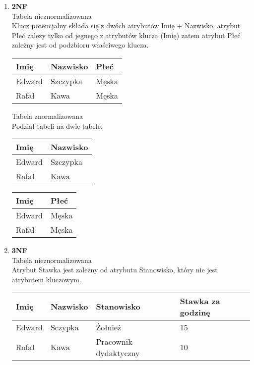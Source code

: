 \documentclass[main.tex]{subfiles}
\begin{document}
\begin{enumerate}
        \item \textbf{2NF}\\
        Tabela nieznormalizowana\\
        Klucz potencjalny składa się z dwóch atrybutów Imię + Nazwisko, atrybut Płeć zalezy tylko od jegnego z atrybutów klucza (Imię) zatem atrybut Płeć zależny jest od podzbioru właściwego klucza.
        \begin{table}[H]
            \begin{tabular}{|l|l|l|}
                \hline
                Imię & Nazwisko & Płeć  \\ \hline
                Edward & Szczypka & Męska \\ \hline
                Rafał & Kawa & Męska \\ \hline
            \end{tabular}
        \end{table}

        Tabela znormalizowana\\
        Podział tabeli na dwie tabele.

        \begin{table}[H]
            \begin{tabular}{|l|l|}
                \hline
                Imię & Nazwisko \\ \hline
                Edward & Szczypka \\ \hline
                Rafał & Kawa     \\ \hline
            \end{tabular}
        \end{table}

        \begin{table}[H]
            \begin{tabular}{|l|l|}
                \hline
                Imię & Płeć  \\ \hline
                Edward & Męska \\ \hline
                Rafał & Męska \\ \hline
            \end{tabular}
        \end{table}

        \item \textbf{3NF}\\
        Tabela nieznormalizowana\\
        Atrybut Stawka jest zależny od atrybutu Stanowisko, który nie jest atrybutem kluczowym.
        \begin{table}[H]
            \begin{tabular}{|l|l|l|l|}
                \hline
                Imię & Nazwisko & Stanowisko & Stawka za godzinę \\ \hline
                Edward & Sczypka & Żołnież & 15                \\ \hline
                Rafał & Kawa & Pracownik dydaktyczny & 10                \\ \hline
            \end{tabular}
        \end{table}


\end{enumerate}
\end{document}
